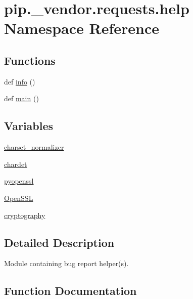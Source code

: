 \hypertarget{namespacepip_1_1__vendor_1_1requests_1_1help}{}\section{pip.\+\_\+vendor.\+requests.\+help Namespace Reference}
\label{namespacepip_1_1__vendor_1_1requests_1_1help}
\subsection*{Functions}
\begin{DoxyCompactItemize}
\item 
def \hyperlink{namespacepip_1_1__vendor_1_1requests_1_1help_a8f9682974dee427e4ba1418c6845181b}{info} ()
\item 
def \hyperlink{namespacepip_1_1__vendor_1_1requests_1_1help_a2f749dc86a7034a0194a6913b626bc46}{main} ()
\end{DoxyCompactItemize}
\subsection*{Variables}
\begin{DoxyCompactItemize}
\item 
\hyperlink{namespacepip_1_1__vendor_1_1requests_1_1help_a9df87c250be454060c91016d841079ae}{charset\+\_\+normalizer}
\item 
\hyperlink{namespacepip_1_1__vendor_1_1requests_1_1help_a20669df7059afb432822bd09174eb5d5}{chardet}
\item 
\hyperlink{namespacepip_1_1__vendor_1_1requests_1_1help_af02e23baa579fff6d0db8c27b566d9af}{pyopenssl}
\item 
\hyperlink{namespacepip_1_1__vendor_1_1requests_1_1help_a13d0638aad5b33d3072d08b48e221e30}{Open\+S\+SL}
\item 
\hyperlink{namespacepip_1_1__vendor_1_1requests_1_1help_a43d4f77af63af5d9337d62648c3af3ae}{cryptography}
\end{DoxyCompactItemize}


\subsection{Detailed Description}
\begin{DoxyVerb}Module containing bug report helper(s).\end{DoxyVerb}
 

\subsection{Function Documentation}
\mbox{\label{namespacepip_1_1__vendor_1_1requests_1_1help_a8f9682974dee427e4ba1418c6845181b}} 
